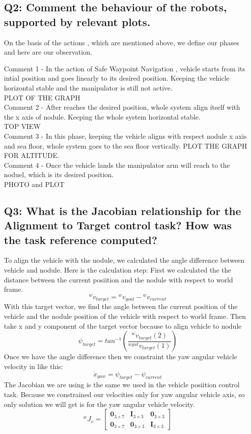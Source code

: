 \documentclass{article}
\begin{document}
\subsection{Q2: Comment the behaviour of the robots, supported by relevant plots.}
On the basis of the actions , which are mentioned above, we define our phases and here are our observation. 

Comment 1 - In the action of Safe Waypoint Navigation , vehicle starts from its intial position and goes linearly to its desired position. Keeping the vehicle horizontal stable and the manipulator is still not active. \\
PLOT OF THE GRAPH\\
Comment 2 - After reaches the desired position, whole system align itself with the x axis of nodule. Keeping the whole system horizontal stable.  \\
TOP VIEW\\
Comment 3 - In this phase, keeping the vehicle aligns with respect nodule x axis and sea floor, whole system goes to the sea floor vertically. 
PLOT THE GRAPH FOR ALTITUDE.\\
Comment 4 - Once the vehicle lands the manipulator arm will reach to the noduel, which is its desired position. 
\\PHOTO and PLOT

\subsection{Q3: What is the Jacobian relationship for the Alignment to Target control task? How was the task reference computed?}
To align the vehicle with the nodule, we calculated the angle difference between vehicle and nodule. Here is the calculation step:
First we calculated the the distance between the current posiition and the nodule with respect to world frame.
$${}^{w}v_{target} = {}^{w}v_{goal} - {}^{w}v_{current} $$  %
\noindent
With this target vector, we find the angle between the current position of the vehicle and the nodule position of the vehicle with respect to world frame. Then take x and y component of the target vector because to align vehicle to nodule\\
$$\psi_{target} = tan^{-1}\left(\frac{{}^{w}v_{target}(2)}{{}^{wgut}v_{target}(1)}\right)$$ %
Once we have the angle difference then we constraint the yaw angular vehicle velocity in like this:\\
$$\dot{x}_{yaw}=\psi_{target}-\psi_{current}$$
The Jacobian we are using is the same we used in the vehicle posiition control task. Because we constrained our velocities only for yaw angular vehicle axis, so only solution we will get is for the yaw angular vehicle velocity. 
$${}^{w}J_v = \begin{bmatrix}
		\mathbf{0}_{3 \times 7} & \mathbf{I}_{3 \times 3} & \mathbf{0}_{3 \times 3} \\
		\mathbf{0}_{3 \times 7} & \mathbf{0}_{3 \times 3} & \mathbf{I}_{3 \times 3}
		\end{bmatrix} $$
\end{document}
